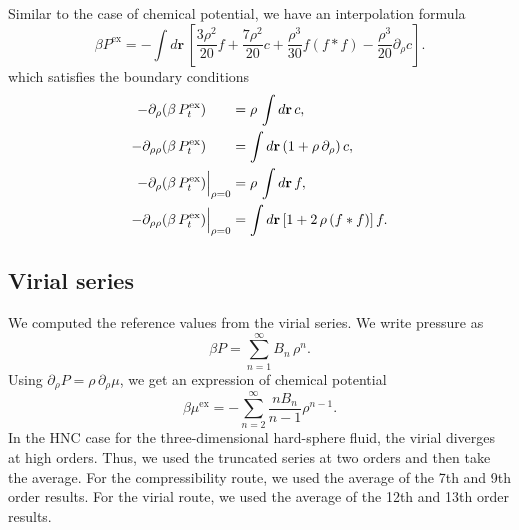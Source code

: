 \documentclass[aip,jcp,reprint,superscriptaddress]{revtex4-1}
\newcommand{\vct}[1]{\mathbf{#1}}
\providecommand{\vr}{} %
\renewcommand{\vr}{\vct{r}}
\newcommand{\supex}[1]{ { { #1 }^{ \mathrm{ex} } } }
\newcommand{\Pex}{\supex{P}}
\newcommand{\Ptex}{P^{ \mathrm{ex} }_t}
\newcommand{\muex}{\supex{\mu}}
\begin{document}
Similar to the case of chemical potential,
we have an interpolation formula
\begin{equation}
\beta \Pex = -\int d\vr \,
\left[
  \frac{3 \rho^2}{20} f
+ \frac{7 \rho^2}{20} c
+ \frac{\rho^3}{30} f (f * f)
- \frac{\rho^3}{20} \partial_\rho c
\right].
\label{eq:P_series}
\end{equation}
%
which satisfies the boundary conditions
%
\begin{equation}
  \begin{split}
  - \partial_{\rho}( \beta \, \Ptex )
  \hphantom{ \Big|_{\rho = 0} }
&=
  \rho \, \int d\vr \, c,
  \\
%
  - \partial_{\rho \rho}( \beta \, \Ptex )
  \hphantom{ \Big|_{\rho = 0} }
&=
  \int d\vr \,
    (1 + \rho \, \partial_\rho) \, c,
  \\
%
  - \partial_\rho( \beta \, \Ptex )
  \Big|_{\rho = 0}
&=
  \rho \, \int d\vr \, f,
  \\
%
  - \partial_{\rho \rho}( \beta \, \Ptex )
  \Big|_{\rho = 0}
&=
  \int d\vr \,
  [1 + 2 \, \rho \, (f*f) ] \, f.
  \end{split}
  \label{eq:Pc_boundary}
\end{equation}






\subsection{Virial series}


We computed the reference values from the virial series.
%
We write pressure as
\[
  \beta P = \sum_{n = 1}^{\infty} B_n \, \rho^n.
\]
%
Using $\partial_\rho P = \rho \, \partial_\rho \mu$,
we get an expression of chemical potential
\begin{equation}
  \beta \muex = - \sum_{n = 2}^\infty \frac{n B_n}{n - 1} \rho^{n - 1}.
  \label{eq:muvirialseries}
\end{equation}
%
In the HNC case for the three-dimensional hard-sphere fluid,
the virial diverges at high orders.
%
Thus, we used the truncated series at two orders
and then take the average.
%
For the compressibility route,
we used the average of the 7th and 9th order results.
%
For the virial route,
we used the average of the 12th and 13th order results.
\end{document}
